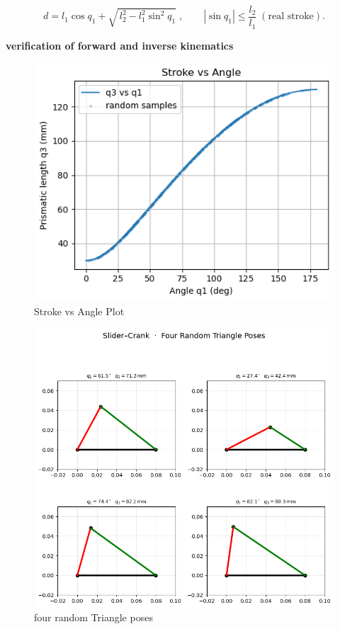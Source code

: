 \documentclass[12pt,a4paper]{article}
\begin{document}
\[%
d = l_{1}\cos q_{1}
    + \sqrt{\,l_{2}^{2}-l_{1}^{2}\sin^{2}q_{1}}\;,
\qquad
|\sin q_{1}|\le\frac{l_{2}}{l_{1}} \;(\text{real stroke}).
\]

\textbf{verification of forward and inverse kinematics}

\begin{figure}[htbp]
  \centering
  \includegraphics[width=0.9\linewidth]{../figs/exercise_5_1.png}
  \caption{Stroke vs Angle Plot}
  \label{fig:stroke_vs_angle}
\end{figure}


\begin{figure}[htbp]
  \centering
  \includegraphics[width=0.9\linewidth]{../figs/exercise_5_2.png}
  \caption{four random Triangle poses}
  \label{fig:slider crank}
\end{figure}
\end{document}

